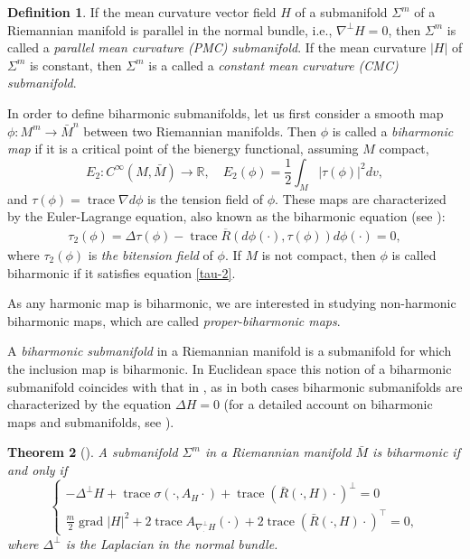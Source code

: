 \documentclass[11pt]{amsart}
\theoremstyle{plain}
\newtheorem{theorem}                {Theorem}      [section]
\theoremstyle{definition}
\newtheorem{definition}   [theorem]  {Definition}
\DeclareMathOperator{\trace}{trace} \DeclareMathOperator{\di}{div}
\DeclareMathOperator{\grad}{grad}
\numberwithin{equation}{section}
\begin{document}
\begin{definition} If the mean curvature vector field $H$ of a submanifold $\Sigma^m$ of a Riemannian manifold is
parallel in the normal bundle, i.e., $\nabla^{\perp}H=0$, then $\Sigma^m$ is called a \textit{parallel mean curvature (PMC) submanifold}. If the mean curvature $|H|$ of $\Sigma^m$ is constant, then $\Sigma^m$ is a called a \textit{constant mean curvature (CMC) submanifold}.
\end{definition}

In order to define biharmonic submanifolds, let us first consider a smooth map $\phi: M^{m} \rightarrow \bar M^{n}$ between two Riemannian manifolds. Then $\phi$ is called a \textit{biharmonic map} if it is a critical point of the bienergy functional, assuming $M$ compact,
$$
E_{2}:C^{\infty}(M,\bar M)\to \mathbb{R}, \quad E_{2}(\phi)=\frac{1}{2}\int_{M} \vert \tau(\phi)\vert ^{2} dv,
$$
and $\tau(\phi)= \trace  \nabla d \phi$ is the tension field of
$\phi$. These maps are characterized by the Euler-Lagrange equation, also known as the biharmonic equation (see \cite{Jiang}):
\begin{eqnarray}\label{tau-2}
\tau_{2}(\phi)=\Delta \tau(\phi)-\trace \overline{R}(d\phi(\cdot),\tau(\phi))d \phi (\cdot)=0,
\end{eqnarray}
where $\tau_{2}(\phi)$ is {\it the bitension field} of $\phi$. If $M$ is not compact, then $\phi$ is called biharmonic if it satisfies equation \eqref{tau-2}.

As any harmonic map is biharmonic, we are interested in studying non-harmonic biharmonic  maps, which are called {\it proper-biharmonic maps}.

A \textit{biharmonic submanifold} in a Riemannian manifold is a submanifold for which the inclusion map is biharmonic. In Euclidean space this notion of a biharmonic submanifold coincides with that in \cite{BYC}, as in both cases biharmonic submanifolds are characterized by the equation $\Delta H=0$ (for a detailed account on biharmonic maps and submanifolds, see \cite{Chen-Ou}).



\begin{theorem}[\cite{BMO,Ou}]\label{thm:split} A submanifold $\Sigma^m$ in a Riemannian manifold $\bar M$ is biharmonic if and only if
\begin{equation}\label{eq:bih}
\begin{cases}
-\Delta^{\perp}H+\trace\sigma(\cdot,A_H\cdot)+\trace(\bar R(\cdot,H)\cdot)^{\perp}=0\\
\frac{m}{2}\grad|H|^2+2\trace A_{\nabla^{\perp}_{\cdot}H}(\cdot)+2\trace(\bar R(\cdot,H)\cdot)^{\top}=0,
\end{cases}
\end{equation}
where $\Delta^{\perp}$ is the Laplacian in the normal bundle.
\end{theorem}
\end{document}
